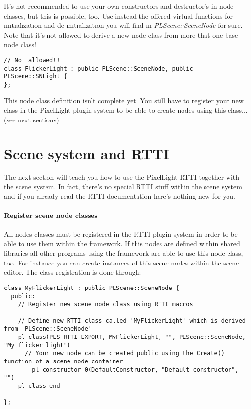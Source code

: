 It's not recommended to use your own constructors and destructor's in node classes, but this is possible, too. Use instead the offered virtual functions for initialization and de-initialization you will find in \emph{PLScene::SceneNode} for sure. Note that it's not allowed to derive a new node class from more that one base node class!

\begin{lstlisting}[caption=Invalid scene node class creating]
// Not allowed!!
class FlickerLight : public PLScene::SceneNode, public PLScene::SNLight {
};
\end{lstlisting}

This node class definition isn't complete yet. You still have to register your new class in the PixelLight plugin system to be able to create nodes using this class... (see next sections)




\section{Scene system and RTTI}
The next section will teach you how to use the PixelLight RTTI together with the scene system. In fact, there's no special RTTI stuff within the scene system and if you already read the RTTI documentation here's nothing new for you.


\paragraph{Register scene node classes}
All nodes classes must be registered in the RTTI plugin system in order to be able to use them within the framework. If this nodes are defined within shared libraries all other programs using the framework are able to use this node class, too. For instance you can create instances of this scene nodes within the scene editor. The class registration is done through:

\begin{lstlisting}[caption=RTTI and own new scene node class]
class MyFlickerLight : public PLScene::SceneNode { 
  public:
    // Register new scene node class using RTTI macros

    // Define new RTTI class called 'MyFlickerLight' which is derived from 'PLScene::SceneNode'
	pl_class(PLS_RTTI_EXPORT, MyFlickerLight, "", PLScene::SceneNode, "My flicker light")
      // Your new node can be created public using the Create() function of a scene node container
		pl_constructor_0(DefaultConstructor, "Default constructor", "")
	pl_class_end

};
\end{lstlisting}

